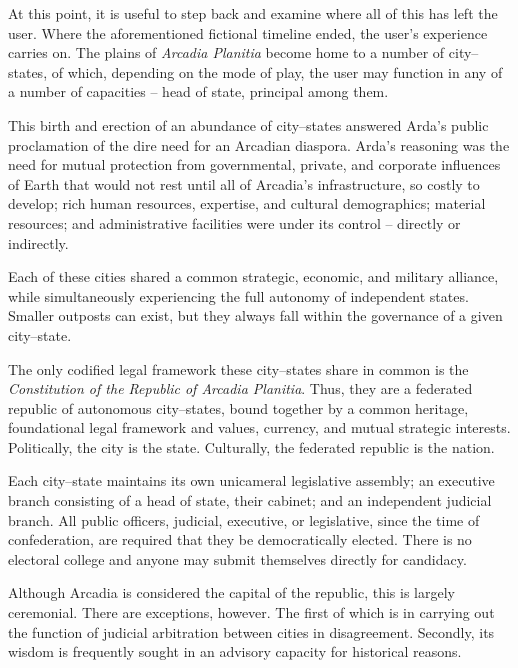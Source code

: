

At this point, it is useful to step back and examine where all of this has left the user. Where the aforementioned fictional timeline ended, the user's experience carries on. The plains of {\it Arcadia Planitia} become home to a number of city--states, of which, depending on the mode of play, the user may function in any of a number of capacities -- head of state, principal among them.

This birth and erection of an abundance of city--states answered Arda's public proclamation of the dire need for an Arcadian diaspora. Arda's reasoning was the need for mutual protection from governmental, private, and corporate influences of Earth that would not rest until all of Arcadia's infrastructure, so costly to develop; rich human resources, expertise, and cultural demographics; material resources; and administrative facilities were under its control -- directly or indirectly.

Each of these cities shared a common strategic, economic, and military alliance, while simultaneously experiencing the full autonomy of independent states. Smaller outposts can exist, but they always fall within the governance of a given city--state.

The only codified legal framework these city--states share in common is the {\it Constitution of the Republic of Arcadia Planitia}. Thus, they are a federated republic of autonomous city--states, bound together by a common heritage, foundational legal framework and values, currency, and mutual strategic interests. Politically, the city is the state. Culturally, the federated republic is the nation.

Each city--state maintains its own unicameral legislative assembly; an executive branch consisting of a head of state, their cabinet; and an independent judicial branch. All public officers, judicial, executive, or legislative, since the time of confederation, are required that they be democratically elected. There is no electoral college and anyone may submit themselves directly for candidacy.

Although Arcadia is considered the capital of the republic, this is largely ceremonial. There are exceptions, however. The first of which is in carrying out the function of judicial arbitration between cities in disagreement. Secondly, its wisdom is frequently sought in an advisory capacity for historical reasons.

